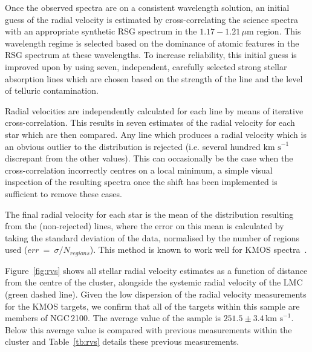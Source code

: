 \documentclass[useAMS,usenatbib]{mn2e}
\def\kms{$\mbox{km s}^{-1}$}
\begin{document}
Once the observed spectra are on a consistent wavelength solution, an initial guess of the radial velocity is estimated by cross-correlating the science spectra with an appropriate synthetic RSG spectrum in the $1.17-1.21\,\mu$m region.
This wavelength regime is selected based on the dominance of atomic features in the RSG spectrum at these wavelengths.
To increase reliability, this initial guess is improved upon by using seven, independent, carefully selected strong stellar absorption lines which are chosen based on the strength of the line and the level of telluric contamination.

Radial velocities are independently calculated for each line by means of iterative cross-correlation.
This results in seven estimates of the radial velocity for each star which are then compared.
Any line which produces a radial velocity which is an obvious outlier to the distribution is rejected (i.e. several hundred \kms discrepant from the other values).
This can occasionally be the case when the cross-correlation incorrectly centres on a local minimum, a simple visual inspection of the resulting spectra once the shift has been implemented is sufficient to remove these cases.

The final radial velocity for each star is the mean of the distribution resulting from the (non-rejected) lines,
where the error on this mean is calculated by taking the standard deviation of the data, normalised by the number of regions used ($err~=~\sigma/N_{regions}$).
This method is known to work well for KMOS spectra~\citep{2015ApJ...798...23L,2015ApJ...803...14P}.

Figure~\ref{fig:rvs} shows all stellar radial velocity estimates as a function of distance from the centre of the cluster, alongside the systemic radial velocity of the LMC (green dashed line).
Given the low dispersion of the radial velocity measurements for the KMOS targets, we confirm that all of the targets within this sample are members of NGC\,2100.
The average value of the sample is $251.5\pm3.4\,$\kms.
Below this average value is compared with previous measurements within the cluster and
Table~\ref{tb:rvs} details these previous measurements.
\end{document}
